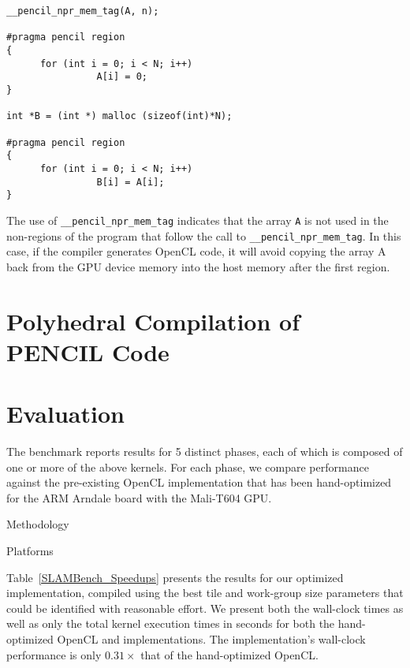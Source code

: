 \documentclass{llncs}
\begin{document}
\begin{lstlisting}[language=pencil]
__pencil_npr_mem_tag(A, n);

#pragma pencil region
{
	  for (int i = 0; i < N; i++)
		        A[i] = 0;
}

int *B = (int *) malloc (sizeof(int)*N);

#pragma pencil region
{
	  for (int i = 0; i < N; i++)
		        B[i] = A[i];
}
\end{lstlisting}

The use of \lstinline!__pencil_npr_mem_tag! indicates that the array \lstinline!A!
is not used in the non-\pencil regions of the program that follow the call to
\lstinline!__pencil_npr_mem_tag!.
In this case, if the \pencil compiler generates OpenCL code, it will avoid
copying the array A back from the GPU device memory into the host memory after
the first \pencil region.


\section{Polyhedral Compilation of PENCIL Code}



\section{Evaluation}
\label{slambench}

The benchmark reports results for 5 distinct phases, each of which
is composed of one or more of the above kernels.
For each phase, we compare performance against the pre-existing OpenCL
implementation that has been hand-optimized for the ARM Arndale board
with the Mali-T604 GPU.



Methodology


Platforms


Table~\ref{SLAMBench_Speedups} presents the results for our optimized
\pencil implementation, compiled using the best \PPCG tile and
work-group size parameters that could be identified with reasonable
effort.
We present both the wall-clock times as well as only the total kernel
execution times in seconds for both the hand-optimized OpenCL and
\pencil implementations.
The \pencil implementation's wall-clock performance is only
$0.31\times$ that of the hand-optimized OpenCL.
\end{document}
